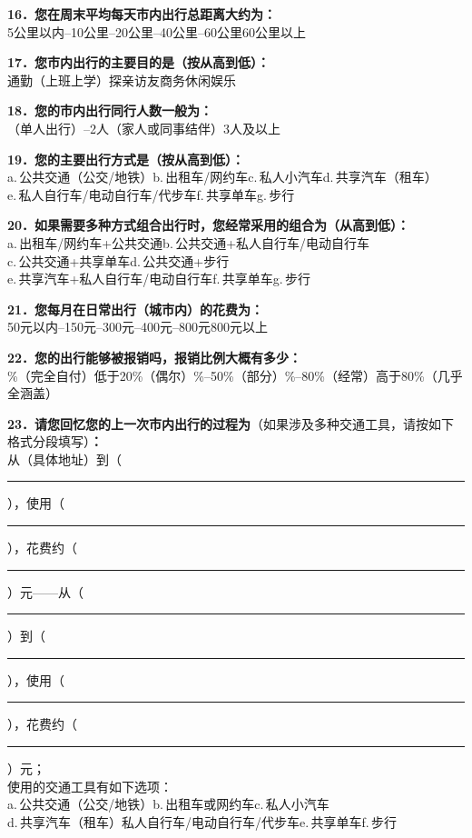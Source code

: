 \noindent\textbf{16．您在周末平均每天市内出行总距离大约为：}\\
\qbox 5公里以内\quad {}--10公里\quad {}--20公里\quad {}--40公里\quad {}--60公里\quad \qbox 60公里以上

\noindent\textbf{17．您市内出行的主要目的是（按从高到低）：}\\
\qbox 通勤（上班上学）\quad \qbox 探亲访友\quad \qbox 商务\quad \qbox 休闲娱乐

\noindent\textbf{18．您的市内出行同行人数一般为：}\\
（单人出行）\quad {}--2人（家人或同事结伴）\quad \qbox 3人及以上

\noindent\textbf{19．您的主要出行方式是（按从高到低）：}\\
a.\,公共交通（公交/地铁）\quad b.\,出租车/网约车\quad c.\,私人小汽车\quad d.\,共享汽车（租车）\\
e.\,私人自行车/电动自行车/代步车\quad f.\,共享单车\quad g.\,步行

\noindent\textbf{20．如果需要多种方式组合出行时，您经常采用的组合为（从高到低）：}\\
a.\,出租车/网约车+公共交通\quad b.\,公共交通+私人自行车/电动自行车\\
c.\,公共交通+共享单车\quad d.\,公共交通+步行\\
e.\,共享汽车+私人自行车/电动自行车\quad f.\,共享单车\quad g.\,步行

\noindent\textbf{21．您每月在日常出行（城市内）的花费为：}\\
\qbox 50元以内\quad {}--150元\quad {}--300元\quad {}--400元\quad {}--800元\quad \qbox 800元以上

\noindent\textbf{22．您的出行能够被报销吗，报销比例大概有多少：}\\
\%（完全自付）\quad \qbox 低于20\%（偶尔）\quad {}\%--50\%（部分）\quad {}\%--80\%（经常）\quad \qbox 高于80\%（几乎全涵盖）

\noindent\textbf{23．请您回忆您的上一次市内出行的过程为}（如果涉及多种交通工具，请按如下格式分段填写）\textbf{：}\\
从（具体地址）到（\rule{1.2cm}{0.4pt}），使用（\rule{1.2cm}{0.4pt}），花费约（\rule{0.8cm}{0.4pt}）元——从（\rule{1.2cm}{0.4pt}）到（\rule{1.2cm}{0.4pt}），使用（\rule{1.2cm}{0.4pt}），花费约（\rule{0.8cm}{0.4pt}）元；\\
使用的交通工具有如下选项：\\
a.\,公共交通（公交/地铁）\quad b.\,出租车或网约车\quad c.\,私人小汽车\\
d.\,共享汽车（租车）私人自行车/电动自行车/代步车\quad e.\,共享单车\quad f.\,步行

